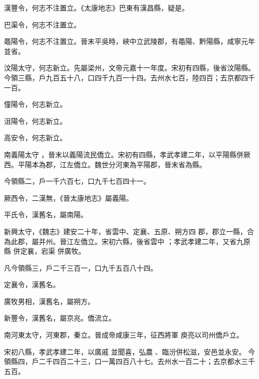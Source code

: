 \begin{pinyinscope}
 漢豐令，何志不注置立。《太康地志》巴東有漢昌縣，疑是。



 巴渠令，何志不注置立。



 黽陽令，何志不注置立。晉末平吳時，峽中立武陵郡，有黽陽、黔陽縣，咸寧元年並省。



 汶陽太守，何志新立。先屬梁州，文帝元嘉十一年度。宋初有四縣，後省汶陽縣。今領三縣，戶九百五十八，口四千九百一十四。去州水七百，陸四百；去京都四千一百。



 僮陽令，何志新立。



 沮陽令，何志新立。



 高安令，何志新立。


南義陽太守
 ，晉末以義陽流民僑立。宋初有四縣，孝武孝建二年，以平陽縣併厥西。平陽本為郡，江左僑立。魏世分河東為平陽郡，晉末省為縣。



 今領縣二，戶一千六百七，口九千七百四十一。



 厥西令，二漢無，《晉太康地志》屬義陽。



 平氏令，漢舊名，屬南陽。


新興太守，《魏志》建安二十年，省雲中、定襄、五原、朔方四
 郡，郡立一縣，合為此郡，屬并州。晉江左僑立。宋初六縣，後省雲中
 ；孝武孝建二年，又省九原縣
 併定襄，宕渠
 併廣牧。



 凡今領縣三，戶二千三百一，口九千五百八十四。



 定襄令，漢舊名。



 廣牧男相，漢舊名，屬朔方。



 新豐令，漢舊名，屬京兆。僑流立。



 南河東太守，河東郡，秦立。晉成帝咸康三年，征西將軍
 庾亮以司州僑戶立。


宋初八縣，孝武孝建二年，以廣戚
 並聞喜，弘農
 、臨汾併松滋，安邑並永安。
 今領縣四，戶二千四百二十三，口一萬四百八十七。去州水一百二十；去京都水三千五百。




\end{pinyinscope}
